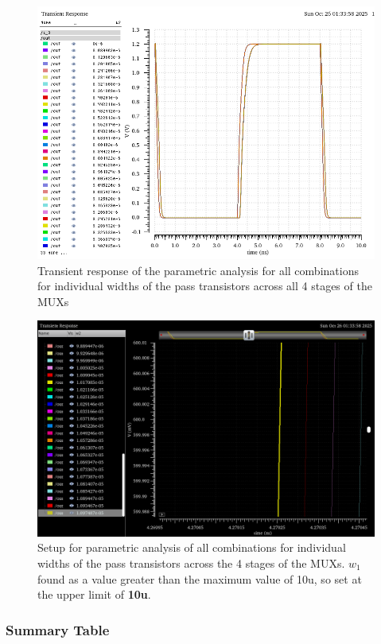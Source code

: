 \documentclass[12pt]{article}
\begin{document}
\begin{figure}[H]
    \centering
    \includegraphics[width=0.5\linewidth]{writeup//figures/wmux_1_parametric_sweep.png}
    \caption{Transient response of the parametric analysis for all combinations for individual widths of the pass transistors across all 4 stages of the MUXs}
\end{figure}

\begin{figure}[H]
    \centering
    \includegraphics[width=0.8\linewidth]{writeup//figures/wmux_1_parametrics_weep.png}
    \caption{Setup for parametric analysis of all combinations for individual widths of the pass transistors across the 4 stages of the MUXs. $w_1$ found as a value greater than the maximum value of 10u, so set at the upper limit of \textbf{10u}.}
\end{figure}

\newpage

\subsubsection*{Summary Table}
\end{document}
